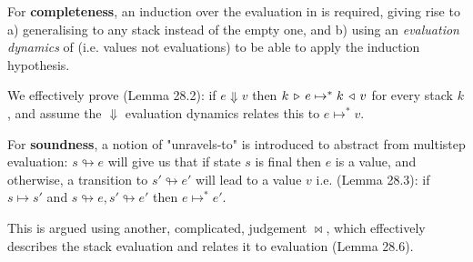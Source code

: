 \documentclass[12pt,a4paper]{article}
\begin{document}
For \textbf{completeness}, an induction over the evaluation in \PCF is required,
giving rise to
a) generalising to any stack instead of the empty one, and 
b) using an \textit{evaluation dynamics} of \PCF (i.e. values not evaluations)
to be able to apply the induction hypothesis.

We effectively prove (Lemma 28.2):
if $ e \Downarrow v $ then $ k \, \triangleright \, e \mapsto^* k \, \triangleleft \, v$ for every stack $k$,
and assume the $\Downarrow$ evaluation dynamics relates this to $e \mapsto^* v$.

\bigskip
For \textbf{soundness}, a notion of "unravels-to" is introduced to abstract from multistep evaluation:
$s \looparrowright e$ will give us that if state $s$ is final then $e$ is a value,
and otherwise, a transition to $s' \looparrowright e'$ will lead to a value $v$
i.e. (Lemma 28.3): if $ s \mapsto s'$ and $s \looparrowright e, s' \looparrowright e'$
then $e \mapsto^* e'$.

This is argued using another, complicated, judgement $\bowtie$, which effectively 
describes the  stack evaluation and relates it to \PCF evaluation (Lemma 28.6).
\end{document}
